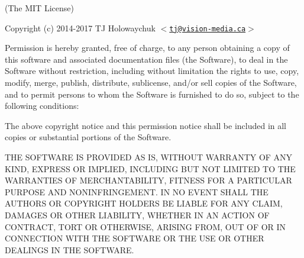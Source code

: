 (The M\+IT License)

Copyright (c) 2014-\/2017 TJ Holowaychuk $<$\href{mailto:tj@vision-media.ca}{\tt tj@vision-\/media.\+ca}$>$

Permission is hereby granted, free of charge, to any person obtaining a copy of this software and associated documentation files (the \textquotesingle{}Software\textquotesingle{}), to deal in the Software without restriction, including without limitation the rights to use, copy, modify, merge, publish, distribute, sublicense, and/or sell copies of the Software, and to permit persons to whom the Software is furnished to do so, subject to the following conditions\+:

The above copyright notice and this permission notice shall be included in all copies or substantial portions of the Software.

T\+HE S\+O\+F\+T\+W\+A\+RE IS P\+R\+O\+V\+I\+D\+ED \textquotesingle{}AS IS\textquotesingle{}, W\+I\+T\+H\+O\+UT W\+A\+R\+R\+A\+N\+TY OF A\+NY K\+I\+ND, E\+X\+P\+R\+E\+SS OR I\+M\+P\+L\+I\+ED, I\+N\+C\+L\+U\+D\+I\+NG B\+UT N\+OT L\+I\+M\+I\+T\+ED TO T\+HE W\+A\+R\+R\+A\+N\+T\+I\+ES OF M\+E\+R\+C\+H\+A\+N\+T\+A\+B\+I\+L\+I\+TY, F\+I\+T\+N\+E\+SS F\+OR A P\+A\+R\+T\+I\+C\+U\+L\+AR P\+U\+R\+P\+O\+SE A\+ND N\+O\+N\+I\+N\+F\+R\+I\+N\+G\+E\+M\+E\+NT. IN NO E\+V\+E\+NT S\+H\+A\+LL T\+HE A\+U\+T\+H\+O\+RS OR C\+O\+P\+Y\+R\+I\+G\+HT H\+O\+L\+D\+E\+RS BE L\+I\+A\+B\+LE F\+OR A\+NY C\+L\+A\+IM, D\+A\+M\+A\+G\+ES OR O\+T\+H\+ER L\+I\+A\+B\+I\+L\+I\+TY, W\+H\+E\+T\+H\+ER IN AN A\+C\+T\+I\+ON OF C\+O\+N\+T\+R\+A\+CT, T\+O\+RT OR O\+T\+H\+E\+R\+W\+I\+SE, A\+R\+I\+S\+I\+NG F\+R\+OM, O\+UT OF OR IN C\+O\+N\+N\+E\+C\+T\+I\+ON W\+I\+TH T\+HE S\+O\+F\+T\+W\+A\+RE OR T\+HE U\+SE OR O\+T\+H\+ER D\+E\+A\+L\+I\+N\+GS IN T\+HE S\+O\+F\+T\+W\+A\+RE. 